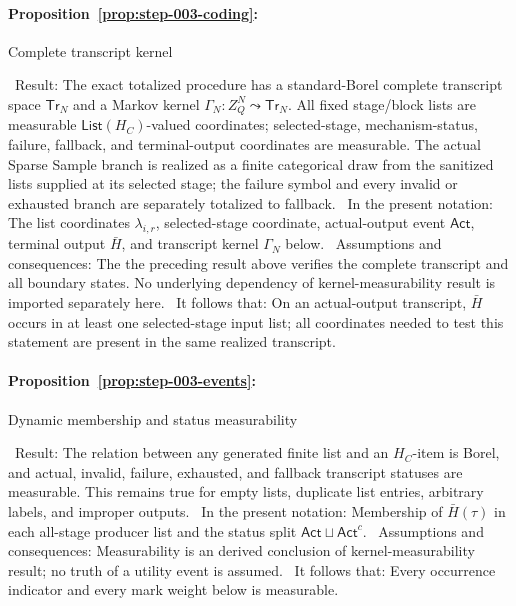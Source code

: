 \paragraph{Proposition~\ref{prop:step-003-coding}:}
Complete transcript kernel

\noindent\textbullet\ Result: The exact totalized procedure has a standard-Borel
  complete transcript space \(\mathsf{Tr}_N\) and a Markov kernel
  \(\Gamma_N:Z_Q^N\leadsto\mathsf{Tr}_N\). All fixed stage/block lists are
  measurable \(\mathsf{List}(H_C)\)-valued coordinates; selected-stage,
  mechanism-status, failure, fallback, and terminal-output coordinates are
  measurable. The actual Sparse Sample branch is realized as a finite
  categorical draw from the sanitized lists supplied at its selected stage;
  the failure symbol and every invalid or exhausted branch are separately
  totalized to fallback.
\noindent\textbullet\ In the present notation: The list coordinates
  \(\lambda_{i,r}\), selected-stage coordinate, actual-output event
  \(\mathsf{Act}\), terminal output \(\bar H\), and transcript kernel
  \(\Gamma_N\) below.
\noindent\textbullet\ Assumptions and consequences: The the preceding result above
  verifies the complete transcript and all boundary states. No underlying
  dependency of kernel-measurability result is imported separately here.
\noindent\textbullet\ It follows that: On an actual-output transcript, \(\bar H\) occurs in at
  least one selected-stage input list; all coordinates needed to test this
  statement are present in the same realized transcript.

\paragraph{Proposition~\ref{prop:step-003-events}:}
Dynamic membership and status measurability

\noindent\textbullet\ Result: The relation between any generated finite list and an
  \(H_C\)-item is Borel, and actual, invalid, failure, exhausted, and
  fallback transcript statuses are measurable. This remains true for empty
  lists, duplicate list entries, arbitrary labels, and improper outputs.
\noindent\textbullet\ In the present notation: Membership of \(\bar H(\tau)\) in each all-stage
  producer list and the status split \(\mathsf{Act}\sqcup
  \mathsf{Act}^c\).
\noindent\textbullet\ Assumptions and consequences: Measurability is an  derived
  conclusion of kernel-measurability result; no truth of a utility event is assumed.
\noindent\textbullet\ It follows that: Every occurrence indicator and every mark weight below is
  measurable.

